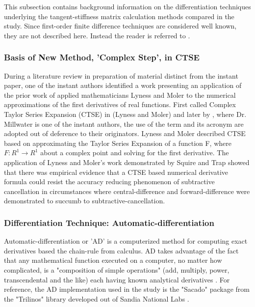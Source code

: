 \documentclass[preprint,12pt]{elsarticle}
\begin{document}
This subsection contains background information on the differentiation techniques underlying the
tangent-stiffness matrix calculation methods compared in the study. Since first-order finite
difference techniques are considered well known, they are not described here. Instead the
reader is referred to \cite[Chap. 4.1.3]{chapra2010}.

\subsubsection{Basis of New Method, 'Complex Step', in CTSE}  

During a literature review in preparation of material distinct from the instant paper, one of the
instant authors identified a work presenting an application of the prior work of applied
mathematicians Lyness and Moler to the numerical approximations of the first derivatives of real
functions. First called Complex Taylor Series Expansion (CTSE) in (Lyness and Moler) and later by
\cite{voorhees2011complex}, where Dr. Millwater is one of the  instant authors, the use of the term and
its acronym are adopted out of deference to their  originators. Lyness and Moler described CTSE
based on  approximating the Taylor Series Expansion of a function F, where $F:R^1 \rightarrow R^1$  about a
complex point and solving for the first derivative. The application of Lyness and Moler's work
demonstrated by Squire and Trap showed that there was empirical evidence that a CTSE based numerical
derivative formula could resist the accuracy reducing phenomenon of subtractive cancellation in
circumstances where central-difference and forward-difference were  demonstrated to succumb to
subtractive-cancellation.       
 
\subsubsection{Differentiation Technique: Automatic-differentiation} 
\label{ADsubsection}

Automatic-differentiation or 'AD' is a computerized method for computing exact derivatives based the
chain-rule from calculus. AD takes advantage of the fact that any
mathematical function executed on a computer, no matter how complicated, is a "composition of simple
operations" (add, multiply, power, transcendental and the like) each having known analytical derivatives
\cite{ref-sacado-presentation}. For reference, the AD
implementation used in the study is the "Sacado" package from the "Trilinos" library developed out of Sandia
National Labs \cite{ref-Sacado}.
\end{document}
